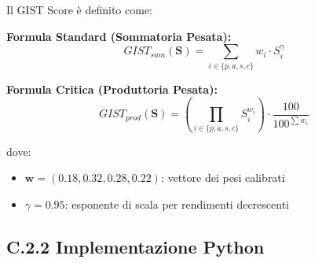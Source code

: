 Il GIST Score è definito come:

\textbf{Formula Standard (Sommatoria Pesata):}
$$GIST_{sum}(\mathbf{S}) = \sum_{i \in \{p,a,s,c\}} w_i \cdot S_i^{\gamma}$$

\textbf{Formula Critica (Produttoria Pesata):}
$$GIST_{prod}(\mathbf{S}) = \left(\prod_{i \in \{p,a,s,c\}} S_i^{w_i}\right) \cdot \frac{100}{100^{\sum w_i}}$$

dove:
\begin{itemize}
\item $\mathbf{w} = (0.18, 0.32, 0.28, 0.22)$: vettore dei pesi calibrati
\item $\gamma = 0.95$: esponente di scala per rendimenti decrescenti
\end{itemize}

\subsection{C.2.2 Implementazione Python}

